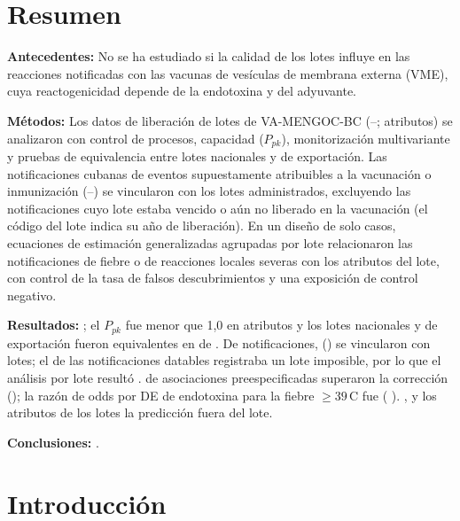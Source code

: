 \documentclass[11pt]{article}
\begin{document}
\section*{Resumen}
\noindent\textbf{Antecedentes:} No se ha estudiado si la calidad de los lotes influye en las
reacciones notificadas con las vacunas de vesículas de membrana externa (VME), cuya reactogenicidad
depende de la endotoxina y del adyuvante.\par
\noindent\textbf{Métodos:} Los datos de liberación de \PTNLots{} lotes de VA-MENGOC-BC
(\PTLotFirstYear--\PTLotLastYear; \PTNAttributes{} atributos) se analizaron con control de procesos,
capacidad ($P_{pk}$), monitorización multivariante y pruebas de equivalencia entre lotes nacionales y
de exportación. Las notificaciones cubanas de eventos
supuestamente atribuibles a la vacunación o inmunización (\VStudyFirstYear--\VStudyLastYear) se
vincularon con los lotes administrados, excluyendo las notificaciones cuyo lote estaba vencido o
aún no liberado en la vacunación (el código del lote indica su año de liberación). En un diseño de
solo casos, ecuaciones de estimación generalizadas agrupadas por lote relacionaron las
notificaciones de fiebre o de reacciones locales severas con los atributos del lote, con control de
la tasa de falsos descubrimientos y una exposición de control negativo.\par
\noindent\textbf{Resultados:} \PTConformitySentence; el $P_{pk}$ fue menor que 1,0 en
\PTNAttrPpkBelowOne{} atributos y los lotes nacionales y de exportación fueron equivalentes en
\PTNEquivalent{} de \PTNAttributes. De \PTNTargetReports{} notificaciones, \PTNLinked{}
(\PTLinkRate) se vincularon con \PTNLinkedLots{} lotes; el \PTLotInconsistentPct{} de las
notificaciones datables registraba un lote imposible, por lo que el análisis por lote resultó
\PTFeasibilityWord. \PTNSignificantFDR{} de \PTNPrimaryTests{}
asociaciones preespecificadas superaron la corrección (\PTSignificantList); la razón de odds por DE
de endotoxina para la fiebre ${}\geq39$\,\textdegree{}C fue
\PTEvFeverThreeNineEndotoxinOR{} (\CI{} \PTEvFeverThreeNineEndotoxinCI). \PTNegControlSentence, y
los atributos de los lotes \PTIncrementalWord{} la predicción fuera del lote.\par
\noindent\textbf{Conclusiones:} \PTConclusionSentence.

\clearpage
\section{Introducción}\label{sec:intro}
\end{document}
